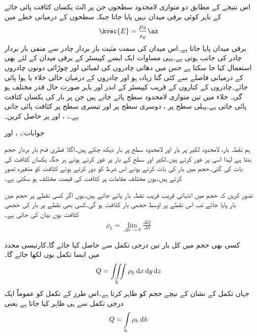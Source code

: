 اس نتیجے کے مطابق دو متوازی لامحدود سطحوں جن پر الٹ یکساں کثافت پائی جائے کے باہر کوئی برقی میدان نہیں پایا جاتا جبکہ سطحوں کے درمیانی خطے میں
\begin{align}\label{مساوات_کولمب_متوازی_چادر_کپیسٹر_کا_میدان}
\kvec{E}=\frac{\rho_S}{\epsilon_0}\ax
\end{align}
برقی میدان پایا جاتا ہے۔اس میدان کی سمت مثبت بار بردار چادر سے منفی بار بردار چادر کی جانب ہوتی ہے۔یہی مساوات ایک ایسے کپیسٹر کے برقی میدان کے لئے بھی استعمال کیا جا سکتا ہے  جس میں دھاتی چادروں  کی لمبائی اور چوڑائی دونوں چادروں کے درمیانی فاصلے سے کئی گنا زیادہ ہو اور چادروں کے درمیان خالی خلاء یا ہوا پائی جائے۔چادروں کے کناروں کے قریب کپیسٹر کے اندر اور باہر صورت حال قدر مختلف ہو گی۔ 
خلاء میں تین متوازی لامحدود سطح پائے جاتے ہیں جن پر بار کی یکساں کثافت پائی جاتی ہے۔پہلی سطح  پر  ، دوسری سطح   پر   اور تیسری سطح  پر   کثافت پائی جاتی ہے۔، ، اور  پر  حاصل کریں۔

جوابات:، ،  اور  

ہم نقطہ بار، لامحدود لکیر پر بار اور لامحدود سطح پر بار دیکھ چکے ہیں۔اگلا فطری قدم  بار بردار حجم بنتا ہے لہٰذا اسی پر غور کرتے ہیں۔لکیر اور سطح کے بار  پر غور کرتے ہوئے ہر جگہ یکساں کثافت کی بات کی گئی۔حجم میں بار کی بات کرتے ہوئے اس شرط کو دور کرتے ہوئے کثافت کو متغیرہ تصور کرتے ہیں۔یوں مختلف مقامات پر کثافت کی قیمت مختلف ہو سکتی ہے۔

تصور کریں کہ حجم میں انتہائی قریب قریب نقطہ بار پائے جاتے ہیں۔یوں اگر کسی نقطے پر  حجم میں  بار پایا جائے تب اس نقطے پر اوسط حجمی بار کثافت  ہو گی۔کسی بھی نقطے پر بار کی حجمی  کثافت  یوں بیان کی جاتی ہے۔
\begin{align}
\rho_h=\lim_{\Delta h \to 0} \frac{\Delta Q}{\Delta h}
\end{align} 

کسی بھی حجم میں کل بار   تین درجی تکمل سے حاصل کیا جائے گا۔کارتیسی محدد میں ایسا تکمل یوں لکھا جائے گا۔
\begin{align}
Q=\iiint\limits_{\textrm{h}} \rho_h \dif x \dif y \dif z
\end{align}
جہاں تکمل کے نشان کے نیچے  حجم کو ظاہر کرتا ہے۔اس طرز کے تکمل کو عموماً ایک درجی تکمل سے ہی ظاہر کیا جاتا ہے یعنی
\begin{align}
Q=\int\limits_{\textrm{h}} \rho_h \dif h
\end{align}


